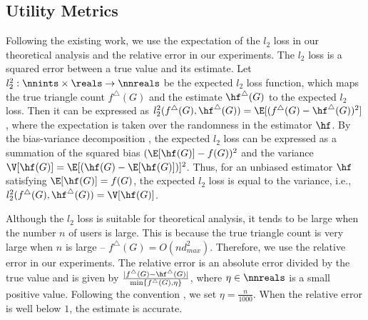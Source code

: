 \subsection{Utility Metrics}
\label{chap3-sub:utility}
Following the existing work, we use the expectation of the $l_2$ loss \cite{Kairouz_ICML16,Murakami_USENIX19,Wang_USENIX17} in our theoretical analysis and the relative error \cite{Bindschaedler_SP16,Chen_CCS12,Xiao_SIGMOD11} in our experiments. 
The $l_2$ loss is a squared error between a true value and its estimate. 
Let 
$l_2^2: \nnints \times \reals \rightarrow \nnreals$ 
be the expected $l_2$ loss function, which maps the true triangle count $f^\triangle(G)$ and the estimate $\hf^\triangle(G)$ to the expected $l_2$ loss. 
Then it can be expressed as $l_2^2(f^\triangle(G), \hf^\triangle(G)) = \E[(f^\triangle(G) - \hf^\triangle(G))^2]$, where the expectation is taken over the randomness in the estimator $\hf$. 
By the bias-variance decomposition \cite{mlpp}, the expected $l_2$ loss can be expressed as a summation of the squared bias $(\E[\hf(G)] - f(G))^2$ and the variance $\V[\hf(G)] = \E[(\hf(G) - \E[\hf(G)])]^2$. 
Thus, for an unbiased estimator $\hf$ satisfying $\E[\hf(G)] = f(G)$, the expected $l_2$ loss is equal to the variance, i.e., $l_2^2(f^\triangle(G), \hf^\triangle(G)) = \V[\hf(G)]$. 

Although the $l_2$ loss is suitable for theoretical analysis, it tends to be large when the number $n$ of users is large. 
This is because the true triangle count is very large when $n$ is large -- $f^\triangle(G) = O(n d_{max}^2)$. 
Therefore, we use the relative error in our experiments. 
The relative error is an absolute error divided by the true value and is given by $\frac{|f^\triangle(G) - \hf^\triangle(G)|}{\min\{f^\triangle(G), \eta\}}$, where $\eta \in \nnreals$ is a small positive value. 
Following the convention \cite{Bindschaedler_SP16,Chen_CCS12,Xiao_SIGMOD11}, we set $\eta = \frac{n}{1000}$. 
When the relative error is well below $1$, the estimate is accurate. 